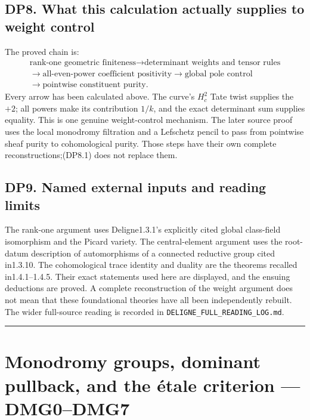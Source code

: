 \documentclass[
]{report}
\begin{document}
\section{DP8. What this calculation actually supplies to weight
control}\label{dp8.-what-this-calculation-actually-supplies-to-weight-control}

The proved chain is: \[
\begin{gathered}
\text{rank-one geometric finiteness}
\longrightarrow\text{determinant weights and tensor rules}\\
\longrightarrow\text{all-even-power coefficient positivity}
\longrightarrow\text{global pole control}\\
\longrightarrow\text{pointwise constituent purity}.
\end{gathered}
\tag{DP8.1}
\] Every arrow has been calculated above. The curve's \(H_c^2\) Tate
twist supplies the \(+2\); all powers make its contribution \(1/k\), and
the exact determinant sum supplies equality. This is one genuine
weight-control mechanism. The later source proof uses the local
monodromy filtration and a Lefschetz pencil to pass from pointwise sheaf
purity to cohomological purity. Those steps have their own complete
reconstructions;(DP8.1) does not replace them.

\section{DP9. Named external inputs and reading
limits}\label{dp9.-named-external-inputs-and-reading-limits}

The rank-one argument uses Deligne1.3.1's explicitly cited global
class-field isomorphism and the Picard variety. The central-element
argument uses the root-datum description of automorphisms of a connected
reductive group cited in1.3.10. The cohomological trace identity and
duality are the theorems recalled in1.4.1--1.4.5. Their exact statements
used here are displayed, and the ensuing deductions are proved. A
complete reconstruction of the weight argument does not mean that these
foundational theories have all been independently rebuilt. The wider
full-source reading is recorded in
\nolinkurl{DELIGNE_FULL_READING_LOG.md}.

\begin{center}\rule{0.5\linewidth}{0.5pt}\end{center}

\chapter{Monodromy groups, dominant pullback, and the étale criterion
---
DMG0--DMG7}\label{monodromy-groups-dominant-pullback-and-the-uxe9tale-criterion-dmg0dmg7}
\end{document}
